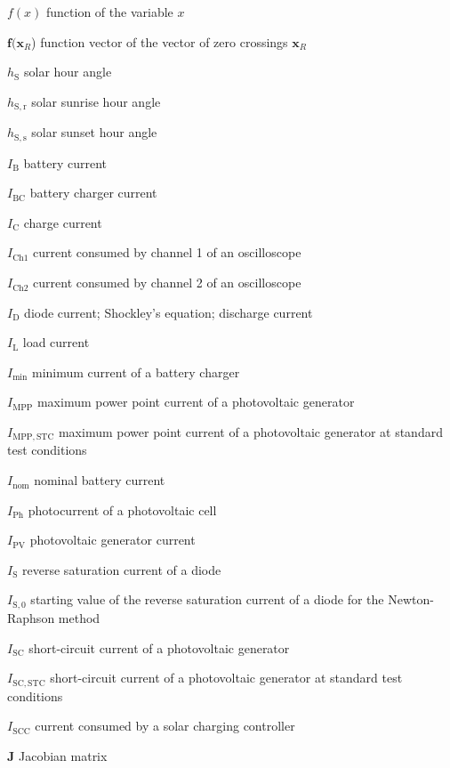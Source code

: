 \begin{symb}
\item[$f(x)$]							function of the variable $x$
\item[$\mathrm{\mathbf{f}}(\mathrm{\mathbf{x}}_R$)]		function vector of the vector of zero crossings $\mathrm{\mathbf{x}}_R$
\item[$h_\mathrm{S}$]					solar hour angle
\item[$h_\mathrm{S,r}$]					solar sunrise hour angle
\item[$h_\mathrm{S,s}$]					solar sunset hour angle
\item[$I_\mathrm{B}$]					battery current
\item[$I_\mathrm{BC}$]					battery charger current
\item[$I_\mathrm{C}$]					charge current
\item[$I_\mathrm{Ch1}$]					current consumed by channel 1 of an oscilloscope
\item[$I_\mathrm{Ch2}$]					current consumed by channel 2 of an oscilloscope
\item[$I_\mathrm{D}$]					diode current; Shockley's equation; discharge current
\item[$I_\mathrm{L}$]					load current
\item[$I_\mathrm{min}$]					minimum current of a battery charger
\item[$I_\mathrm{MPP}$]					maximum power point current of a photovoltaic generator
\item[$I_\mathrm{MPP,STC}$]				maximum power point current of a photovoltaic generator at standard test conditions
\item[$I_\mathrm{nom}$]					nominal battery current
\item[$I_\mathrm{Ph}$]					photocurrent of a photovoltaic cell
\item[$I_\mathrm{PV}$]					photovoltaic generator current
\item[$I_\mathrm{S}$]					reverse saturation current of a diode
\item[$I_\mathrm{S,0}$]					starting value of the reverse saturation current of a diode for the Newton-Raphson method
\item[$I_\mathrm{SC}$]					short-circuit current of a photovoltaic generator
\item[$I_\mathrm{SC,STC}$]				short-circuit current of a photovoltaic generator at standard test conditions
\item[$I_\mathrm{SCC}$]					current consumed by a solar charging controller
\item[$\mathrm{\mathbf{J}}$]			Jacobian matrix

\end{symb}
